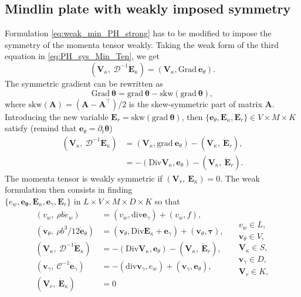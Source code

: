 \documentclass{ifacconf}
\begin{document}
\subsection{Mindlin plate with weakly imposed symmetry}\label{sec:min_weak}
Formulation \eqref{eq:weak_min_PH_strong} has to be modified to impose the symmetry of the momenta tensor weakly. Taking the weak form of the third equation in \eqref{eq:PH_sys_Min_Ten}, we get
\[
(\bm{V}_\kappa, \ \mathcal{D}^{-1} \dot{\bm{E}}_\kappa) = (\bm{V}_\kappa, \mathrm{Grad}\ \bm{e}_\theta ). 
\]
The symmetric gradient can be rewritten as 
\[
\mathrm{Grad}\ \bm{\theta} = \mathrm{grad}\ \bm{\theta} - \mathrm{skw}(\mathrm{grad} \ \bm{\theta}),
\]
where $\mathrm{skw}(\bm{A})=(\bm{A} - \bm{A}^\top)/2$ is the skew-symmetric part of matrix $\bm{A}$. Introducing the new variable $\bm{E}_r = \mathrm{skw}(\mathrm{grad}\ \bm{\theta})$, then $\{\bm{e}_\theta, \bm{E}_\kappa, \bm{E}_r\} \in V\times M\times K$ satisfy (remind that $\bm{e}_\theta = \partial_t {\bm{\theta}}$)
\begin{equation*}
	\begin{aligned}
	(\bm{V}_\kappa, \ \mathcal{D}^{-1} \dot{\bm{E}}_\kappa) &= (\bm{V}_\kappa, \mathrm{grad}\ \bm{e}_\theta) - (\bm{V}_\kappa, \ \dot{\bm{E}}_r), \\
	&= -(\mathrm{Div}\bm{V}_\kappa, \bm{e}_\theta) - (\bm{V}_\kappa, \ \dot{\bm{E}}_r).
	\end{aligned}
\end{equation*}
The momenta tensor is weakly symmetric if $(\bm{V}_r, \ \bm{E}_{\kappa}) = 0$. The weak formulation then consists in finding \\
$\{e_w, \bm{e}_{\bm{\theta}}, \bm{E}_{\kappa}, \bm{e}_{\gamma}, \bm{E}_{r}\}$ in $L \times V \times M \times D \times K$ so that 
 \begin{equation}
 \label{eq:weak_min_PH_weak}
 \begin{aligned}
 (v_w, \ \rho b \dot{e}_w) &= (v_w, \mathrm{div} \bm{e}_\gamma) + (v_w, f), \\ 
 (\bm{v}_\theta, \ \rho b^3/12  \dot{\bm{e}}_\theta) &= (\bm{v}_\theta, \mathrm{Div} \bm{E}_\kappa + \bm{e}_\gamma) + (\bm{v}_\theta, \bm{\tau}), \\  
 (\bm{V}_\kappa, \ \mathcal{D}^{-1} \dot{\bm{E}}_\kappa) &= -(\mathrm{Div} \bm{V}_\kappa,  \bm{e}_\theta) - (\bm{V}_\kappa, \ \dot{\bm{E}}_r), \\ 
 (\bm{v}_\gamma, \ \mathcal{C}^{-1} \dot{\bm{e}}_\gamma) &= -(\mathrm{div} \bm{v}_\gamma, e_w ) + (\bm{v}_\gamma, \bm{e}_{\theta}), \\ 
 (\bm{V}_r, \ \dot{\bm{E}}_\kappa) &= 0
 \end{aligned} \quad
 \begin{aligned}
 v_w \in L, \\
 \bm{v}_\theta \in V, \\
 \bm{V}_\kappa \in S, \\
 \bm{v}_\gamma \in D, \\
 \bm{V}_r \in K, \\
 \end{aligned}
 \end{equation}
\end{document}
